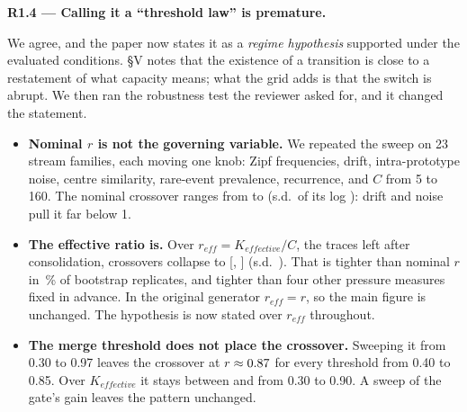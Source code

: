 \documentclass[11pt]{article}
\newcommand{\comment}[1]{\par\medskip\noindent\textbf{#1}\par}
\begin{document}
\comment{R1.4 --- Calling it a ``threshold law'' is premature.}
We agree, and the paper now states it as a \emph{regime hypothesis} supported
under the evaluated conditions. §V notes that the existence of a transition is
close to a restatement of what capacity means; what the grid adds is that the
switch is abrupt. We then ran the robustness test the reviewer asked for, and
it changed the statement.
\begin{itemize}
\item \textbf{Nominal $r$ is not the governing variable.} We repeated the
sweep on 23 stream families, each moving one knob: Zipf frequencies, drift,
intra-prototype noise, centre similarity, rare-event prevalence, recurrence,
and $C$ from 5 to 160. The nominal crossover ranges from
 to
(s.d.\ of its log
): drift
and noise pull it far below 1.
\item \textbf{The effective ratio is.} Over $r_{eff}=K_{effective}/C$, the
traces left after consolidation, crossovers collapse to
[,
]
(s.d.\ ).
That is tighter than nominal $r$ in
\,\%
of bootstrap replicates, and tighter than four other pressure measures fixed
in advance. In the original generator $r_{eff}=r$, so the main figure is
unchanged. The hypothesis is now stated over $r_{eff}$ throughout.
\item \textbf{The merge threshold does not place the crossover.} Sweeping it
from 0.30 to 0.97 leaves the crossover at
$r\approx\result{exp07_merge_sensitivity:umbral_fusion.synthetic.umbrales.t085.cruce_r_nominal|f2}{0.87}$
for every threshold from 0.40 to 0.85. Over $K_{effective}$ it stays between
and
from 0.30 to 0.90. A sweep of the gate's gain leaves the pattern unchanged.
\end{itemize}
\end{document}
